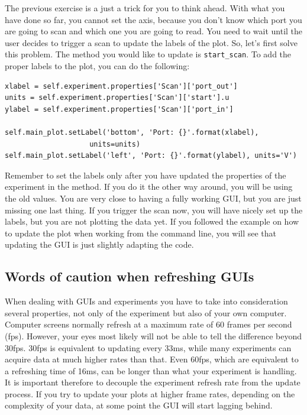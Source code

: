 
The previous exercise is a just a trick for you to think ahead. With
what you have done so far, you cannot set the axis, because you don't
know which port you are going to scan and which one you are going to
read. You need to wait until the user decides to trigger a scan to
update the labels of the plot. So, let's first solve this problem. The method you would like to update is \texttt{start_scan}. To add the
proper labels to the plot, you can do the following:

\begin{verbatim}
xlabel = self.experiment.properties['Scan']['port_out']
units = self.experiment.properties['Scan']['start'].u
ylabel = self.experiment.properties['Scan']['port_in']

self.main_plot.setLabel('bottom', 'Port: {}'.format(xlabel),
                    units=units)
self.main_plot.setLabel('left', 'Port: {}'.format(ylabel), units='V')
\end{verbatim}

Remember to set the labels only after you have updated the properties of
the experiment in the method. If you do it the other way around, you
will be using the old values. You are very close to having a fully
working {GUI}, but you are just missing one last thing. If you trigger
the scan now, you will have nicely set up the labels, but you are not
plotting the data yet. If you followed the example on how to update the
plot when working from the command line, you will see that updating the
{GUI} is just slightly adapting the code.

\subsection{Words of caution when refreshing GUIs}\label{words-of-caution-when-refreshingguis}
When dealing with GUIs and experiments you have to take into
consideration several properties, not only of the experiment but also of
your own computer. Computer screens normally refresh at a maximum rate
of 60 frames per second (fps). However, your eyes most likely will not
be able to tell the difference beyond 30fps. 30fps is equivalent to
updating every 33ms, while many experiments can acquire data at much
higher rates than that. Even 60fps, which are equivalent to a refreshing
time of 16ms, can be longer than what your experiment is handling. It is
important therefore to decouple the experiment refresh rate from the
update process. If you try to update your plots at higher frame rates,
depending on the complexity of your data, at some point the {GUI} will
start lagging behind.


